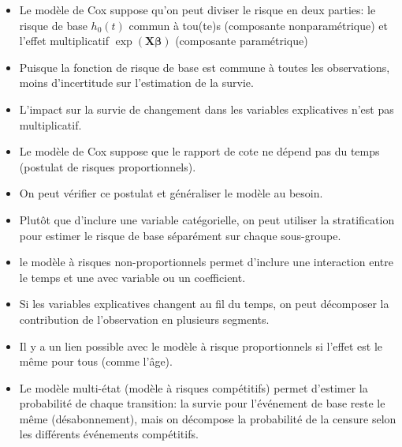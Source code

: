 \documentclass[
  11pt,
  letterpaper,
]{scrbook}
\providecommand{\tightlist}{%
  \setlength{\itemsep}{0pt}\setlength{\parskip}{0pt}}\usepackage{longtable,booktabs,array}
\theoremstyle{definition}
\theoremstyle{remark}
\begin{document}
\begin{tcolorbox}[enhanced jigsaw, coltitle=black, left=2mm, opacitybacktitle=0.6, colback=white, leftrule=.75mm, colframe=quarto-callout-note-color-frame, toprule=.15mm, colbacktitle=quarto-callout-note-color!10!white, opacityback=0, bottomtitle=1mm, toptitle=1mm, rightrule=.15mm, title=\textcolor{quarto-callout-note-color}{\faInfo}\hspace{0.5em}{En résumé}, breakable, titlerule=0mm, arc=.35mm, bottomrule=.15mm]

\begin{itemize}
\tightlist
\item
  Le modèle de Cox suppose qu'on peut diviser le risque en deux parties:
  le risque de base \(h_0(t)\) commun à tou(te)s (composante
  nonparamétrique) et l'effet multiplicatif
  \(\exp(\mathbf{X}\boldsymbol{\beta})\) (composante paramétrique)
\item
  Puisque la fonction de risque de base est commune à toutes les
  observations, moins d'incertitude sur l'estimation de la survie.
\item
  L'impact sur la survie de changement dans les variables explicatives
  n'est pas multiplicatif.
\item
  Le modèle de Cox suppose que le rapport de cote ne dépend pas du temps
  (postulat de risques proportionnels).
\item
  On peut vérifier ce postulat et généraliser le modèle au besoin.
\item
  Plutôt que d'inclure une variable catégorielle, on peut utiliser la
  stratification pour estimer le risque de base séparément sur chaque
  sous-groupe.
\item
  le modèle à risques non-proportionnels permet d'inclure une
  interaction entre le temps et une avec variable ou un coefficient.
\item
  Si les variables explicatives changent au fil du temps, on peut
  décomposer la contribution de l'observation en plusieurs segments.
\item
  Il y a un lien possible avec le modèle à risque proportionnels si
  l'effet est le même pour tous (comme l'âge).
\item
  Le modèle multi-état (modèle à risques compétitifs) permet d'estimer
  la probabilité de chaque transition: la survie pour l'événement de
  base reste le même (désabonnement), mais on décompose la probabilité
  de la censure selon les différents événements compétitifs.
\end{itemize}

\end{tcolorbox}
\end{document}
